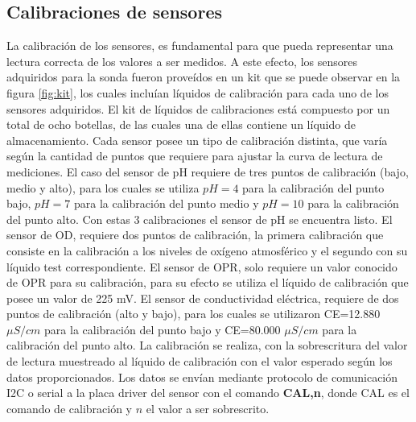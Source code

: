 \subsection{Calibraciones de sensores}
La calibraci\'on de los sensores, es fundamental para que pueda representar una lectura correcta de los valores a ser medidos. 
A este efecto, los sensores adquiridos para la sonda fueron prove\'idos en un kit que se puede observar en la figura \ref{fig:kit}, los cuales inclu\'ian l\'iquidos de calibraci\'on para cada uno de los sensores adquiridos. 
El kit de l\'iquidos de calibraciones est\'a compuesto por un total de ocho botellas, de las cuales una de ellas contiene un l\'iquido de almacenamiento. 
Cada sensor posee un tipo de calibraci\'on distinta, que var\'ia seg\'un la cantidad de puntos que requiere para ajustar la curva de lectura de mediciones.
El caso del sensor de pH requiere de tres puntos de calibración (bajo, medio y alto), para los cuales se utiliza $pH=4$ para la calibraci\'on del punto bajo, $pH=7$ para la calibraci\'on del punto medio y $pH=10$ para la calibraci\'on del punto alto. 
Con estas 3 calibraciones el sensor de pH se encuentra listo.
El sensor de OD, requiere dos puntos de calibraci\'on, la primera calibraci\'on que consiste en la calibraci\'on a los niveles de ox\'igeno atmosf\'erico y el segundo con su l\'iquido test correspondiente.
El sensor de OPR, solo requiere un valor conocido de OPR para su calibraci\'on, para su efecto se utiliza el l\'iquido de calibraci\'on que posee un valor de 225 mV.
El sensor de conductividad el\'ectrica, requiere de dos puntos de calibraci\'on (alto y bajo), para los cuales se utilizaron CE=12.880 $\mu S/cm$ para la calibraci\'on del punto bajo y CE=80.000 $\mu S/cm$ para la calibraci\'on del punto alto.
La calibraci\'on se realiza, con la sobrescritura del valor de lectura muestreado al l\'iquido de calibraci\'on con el valor esperado seg\'un los datos proporcionados. 
Los datos se envían mediante protocolo de comunicaci\'on I2C o serial a la placa driver del sensor con el comando \textbf{CAL,n}, donde CAL es el comando de calibraci\'on y $n$ el valor a ser sobrescrito.


